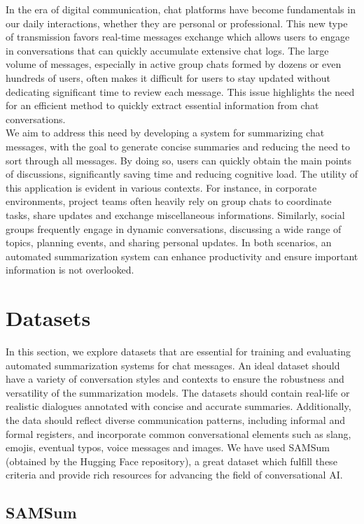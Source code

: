 \documentclass[10pt,twocolumn,letterpaper]{article}
\begin{document}
In the era of digital communication, chat platforms have become fundamentals in our daily interactions, whether they are personal or professional. This new type of transmission favors real-time messages exchange which allows users to engage in conversations that can quickly accumulate extensive chat logs. The large volume of messages, especially in active group chats formed by dozens or even hundreds of users, often makes it difficult for users to stay updated without dedicating significant time to review each message. This issue highlights the need for an efficient method to quickly extract essential information from chat conversations. \\
We aim to address this need by developing a system for summarizing chat messages, with the goal to generate concise summaries and reducing the need to sort through all messages. By doing so, users can quickly obtain the main points of discussions, significantly saving time and reducing cognitive load. The utility of this application is evident in various contexts. For instance, in corporate environments, project teams often heavily rely on group chats to coordinate tasks, share updates and exchange miscellaneous informations. Similarly, social groups frequently engage in dynamic conversations, discussing a wide range of topics, planning events, and sharing personal updates. In both scenarios, an automated summarization system can enhance productivity and ensure important information is not overlooked. 

\section{Datasets}

In this section, we explore datasets that are essential for training and evaluating automated summarization systems for chat messages. An ideal dataset should have a variety of conversation styles and contexts to ensure the robustness and versatility of the summarization models. The datasets should contain real-life or realistic dialogues annotated with concise and accurate summaries. Additionally, the data should reflect diverse communication patterns, including informal and formal registers, and incorporate common conversational elements such as slang, emojis, eventual typos, voice messages and images. We have used SAMSum (obtained by the Hugging Face repository), a great dataset which fulfill these criteria and provide rich resources for advancing the field of conversational AI.

\subsection{SAMSum}
\end{document}
